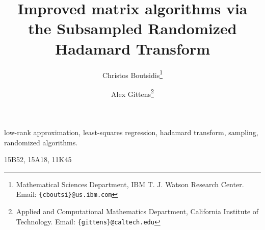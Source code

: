 \documentclass[final]{siamltex}
\title{Improved matrix algorithms via the Subsampled Randomized Hadamard Transform}
\author{
Christos Boutsidis\thanks{Mathematical Sciences Department, IBM T. J. Watson Research Center. Email: \texttt{\{cboutsi\}@us.ibm.com}}
\and
Alex Gittens\thanks{Applied and Computational Mathematics Department,
California Institute of Technology. Email: \texttt{\{gittens\}@caltech.edu}}
}
\begin{document}
\maketitle

\begin{keywords}
low-rank approximation, least-squares regression, hadamard transform, sampling, randomized algorithms.
\end{keywords}

\begin{AMS}
15B52, 15A18, 11K45
\end{AMS}

\pagestyle{myheadings}
\thispagestyle{plain}




%
%
\end{document}
